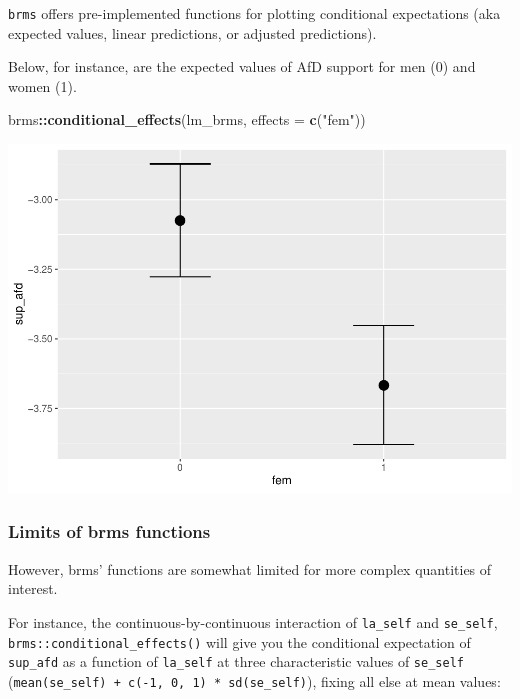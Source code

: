 \documentclass[
  11pt,
]{article}
\newenvironment{Shaded}{\begin{snugshade}}{\end{snugshade}}
\newcommand{\AttributeTok}[1]{\textcolor[rgb]{0.13,0.29,0.53}{#1}}
\newcommand{\FunctionTok}[1]{\textcolor[rgb]{0.13,0.29,0.53}{\textbf{#1}}}
\newcommand{\NormalTok}[1]{#1}
\newcommand{\SpecialCharTok}[1]{\textcolor[rgb]{0.81,0.36,0.00}{\textbf{#1}}}
\newcommand{\StringTok}[1]{\textcolor[rgb]{0.31,0.60,0.02}{#1}}
\begin{document}
\texttt{brms} offers pre-implemented functions for plotting conditional expectations (aka expected values, linear predictions, or adjusted predictions).

Below, for instance, are the expected values of AfD support for men (0) and women (1).

\begin{Shaded}
\begin{Highlighting}[]
\NormalTok{brms}\SpecialCharTok{::}\FunctionTok{conditional\_effects}\NormalTok{(lm\_brms,}
                          \AttributeTok{effects =} \FunctionTok{c}\NormalTok{(}\StringTok{"fem"}\NormalTok{))}
\end{Highlighting}
\end{Shaded}

\includegraphics{02-02-lec_files/figure-latex/brms-marginal-effects-1.pdf}

\hypertarget{limits-of-brms-functions}{%
\subsubsection{Limits of brms functions}\label{limits-of-brms-functions}}

However, brms' functions are somewhat limited for more complex quantities of interest.

For instance, the continuous-by-continuous interaction
of \texttt{la\_self} and \texttt{se\_self}, \texttt{brms::conditional\_effects()} will give you the conditional expectation of \texttt{sup\_afd} as a function of \texttt{la\_self} at three characteristic values of \texttt{se\_self} (\texttt{mean(se\_self)\ +\ c(-1,\ 0,\ 1)\ *\ sd(se\_self)}), fixing all else at mean values:
\end{document}
